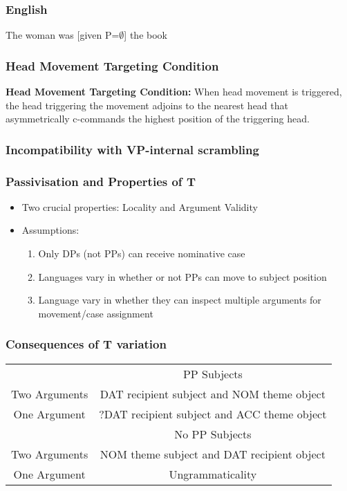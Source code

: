\documentclass{beamer}
\begin{document}
 \begin{frame}
	\frametitle{English}
	\vfill
	The woman was [given P=$\emptyset$] the book
	\vfill
\end{frame}

 \begin{frame}
	\frametitle{Head Movement Targeting Condition}
	\vfill
	 	\textbf{Head Movement Targeting Condition:} When head movement is triggered, the head triggering the movement adjoins to the nearest head that asymmetrically c-commands the highest position of the triggering head.
	\vfill
 \end{frame}
 \begin{frame}
	 \frametitle{Incompatibility with VP-internal scrambling}
\end{frame}

\begin{frame}
	\frametitle{Passivisation and Properties of T}
	\begin{itemize}
		\item Two crucial properties: Locality and Argument Validity
		\item Assumptions:
		\begin{enumerate}
			\item Only DPs (not PPs) can receive nominative case
			\item Languages vary in whether or not PPs can move to subject position
			\item Language vary in whether they can inspect multiple arguments for movement/case assignment
		\end{enumerate}
	\end{itemize}
\end{frame}

\begin{frame}
	\frametitle{Consequences of T variation}
	\begin{tabular}{cc}
		&	PP Subjects \\
Two Arguments	& DAT recipient subject and NOM theme object \\
One Argument    & ?DAT recipient subject and ACC theme object\\
\hline
	      & No PP Subjects \\
Two Arguments & NOM theme subject and DAT recipient object\\
One Argument  & Ungrammaticality\\
	\end{tabular}
\end{frame}
\end{document}
